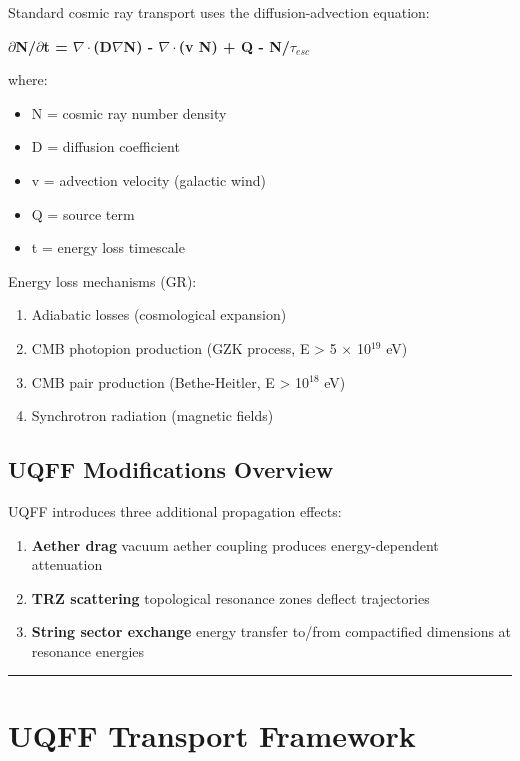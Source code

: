 \documentclass[12pt,a4paper]{article}
\begin{document}
Standard cosmic ray transport uses the diffusion-advection equation:

\textbf{$\partial$N/$\partial$t = $\nabla\cdot$(D$\nabla$N) - $\nabla\cdot$(v N) + Q - N/$\tau_{esc}$}

where:

\begin{itemize}
  \item N = cosmic ray number density
  \item D = diffusion coefficient
  \item v = advection velocity (galactic wind)
  \item Q = source term
  \item t = energy loss timescale
\end{itemize}

Energy loss mechanisms (GR):

\begin{enumerate}
  \item Adiabatic losses (cosmological expansion)
  \item CMB photopion production (GZK process, E > 5 $\times$ 10$^{19}$ eV)
  \item CMB pair production (Bethe-Heitler, E > 10$^{18}$ eV)
  \item Synchrotron radiation (magnetic fields)
\end{enumerate}

\subsection{UQFF Modifications Overview}

UQFF introduces three additional propagation effects:

\begin{enumerate}
  \item \textbf{Aether drag}  vacuum aether coupling produces energy-dependent attenuation
  \item \textbf{TRZ scattering}  topological resonance zones deflect trajectories
  \item \textbf{String sector exchange}  energy transfer to/from compactified dimensions at resonance energies
\end{enumerate}

\medskip\hrule\medskip

\section{UQFF Transport Framework}
\end{document}
